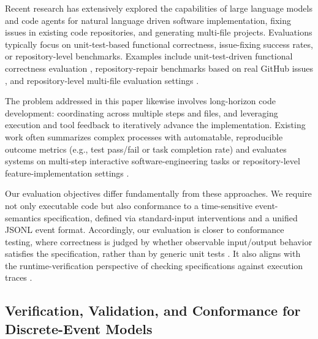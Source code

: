 
Recent research has extensively explored the capabilities of large language models and code agents for natural language driven software implementation, fixing issues in existing code repositories, and generating multi-file projects. Evaluations typically focus on unit-test-based functional correctness, issue-fixing success rates, or repository-level benchmarks. Examples include unit-test-driven functional correctness evaluation \cite{chen2021evaluating_code_llms}, repository-repair benchmarks based on real GitHub issues \cite{jimenez2024swebench}, and repository-level multi-file evaluation settings \cite{liu2024repobench,ding2025nl2repo_bench}.

The problem addressed in this paper likewise involves long-horizon code development: coordinating across multiple steps and files, and leveraging execution and tool feedback to iteratively advance the implementation. Existing work often summarizes complex processes with automatable, reproducible outcome metrics (e.g., test pass/fail or task completion rate) and evaluates systems on multi-step interactive software-engineering tasks or repository-level feature-implementation settings \cite{yang2024sweagent,ding2025nl2repo_bench,li2025fea_bench}.

Our evaluation objectives differ fundamentally from these approaches. We require not only executable code but also conformance to a time-sensitive event-semantics specification, defined via standard-input interventions and a unified JSONL event format. Accordingly, our evaluation is closer to conformance testing, where correctness is judged by whether observable input/output behavior satisfies the specification, rather than by generic unit tests \cite{tretmans2006ioco}. It also aligns with the runtime-verification perspective of checking specifications against execution traces \cite{leucker2009rv}.

\subsection{Verification, Validation, and Conformance for Discrete-Event Models}

